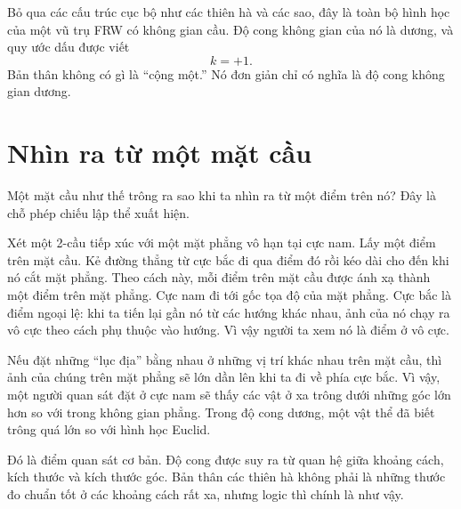 Bỏ qua các cấu trúc cục bộ như các thiên hà và các sao, đây là toàn bộ hình học của một vũ trụ FRW có không gian cầu. Độ cong không gian của nó là dương, và quy ước dấu được viết
\begin{equation}
k=+1.
\end{equation}
Bản thân không có gì là ``cộng một.'' Nó đơn giản chỉ có nghĩa là độ cong không gian dương.

\section{Nhìn ra từ một mặt cầu}

Một mặt cầu như thế trông ra sao khi ta nhìn ra từ một điểm trên nó? Đây là chỗ phép chiếu lập thể xuất hiện.

Xét một 2-cầu tiếp xúc với một mặt phẳng vô hạn tại cực nam. Lấy một điểm trên mặt cầu. Kẻ đường thẳng từ cực bắc đi qua điểm đó rồi kéo dài cho đến khi nó cắt mặt phẳng. Theo cách này, mỗi điểm trên mặt cầu được ánh xạ thành một điểm trên mặt phẳng. Cực nam đi tới gốc tọa độ của mặt phẳng. Cực bắc là điểm ngoại lệ: khi ta tiến lại gần nó từ các hướng khác nhau, ảnh của nó chạy ra vô cực theo cách phụ thuộc vào hướng. Vì vậy người ta xem nó là điểm ở vô cực.

Nếu đặt những ``lục địa'' bằng nhau ở những vị trí khác nhau trên mặt cầu, thì ảnh của chúng trên mặt phẳng sẽ lớn dần lên khi ta đi về phía cực bắc. Vì vậy, một người quan sát đặt ở cực nam sẽ thấy các vật ở xa trông dưới những góc lớn hơn so với trong không gian phẳng. Trong độ cong dương, một vật thể đã biết trông quá lớn so với hình học Euclid.

Đó là điểm quan sát cơ bản. Độ cong được suy ra từ quan hệ giữa khoảng cách, kích thước và kích thước góc. Bản thân các thiên hà không phải là những thước đo chuẩn tốt ở các khoảng cách rất xa, nhưng logic thì chính là như vậy.

\begin{classroomqa}
\end{classroomqa}

\begin{classroomqa}
\end{classroomqa}

